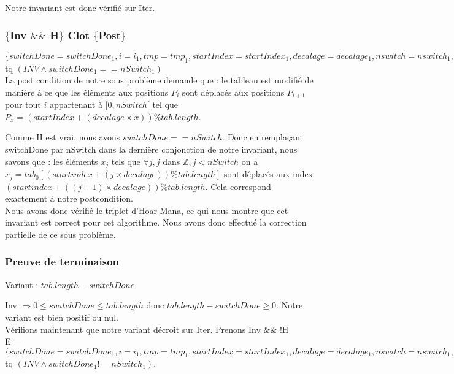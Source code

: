 Notre invariant est donc vérifié sur Iter. \\

\subsubsection*{$\{$Inv $\&\&$ H$\}$ Clot $\{$Post$\}$}

$\{switchDone = switchDone_{1}, i = i_{1}, tmp = tmp_{1}, startIndex = startIndex_{1}, decalage = decalage_{1}, nswitch = nswitch_{1}, tab = tab_{1}\}$\\ 
tq $(INV \wedge switchDone_{1} == nSwitch_{1})$ \\

La post condition de notre sous problème demande que : le tableau est modifié de manière à ce que les éléments aux positions $P_{i}$ sont déplacés aux positions $P_{i+1}$ pour tout $i$ appartenant à $[0,nSwitch[$ tel que $P_{x} = (startIndex + (decalage\times x)) \% tab.length$.

Comme H est vrai, nous avons $switchDone == nSwitch$. Donc en remplaçant switchDone par nSwitch dans la dernière conjonction de notre invariant, nous savons que : les éléments $x_{j}$ tels que $\forall j, j$ dans $\mathbb{Z}, j<nSwitch$ on a $x_{j}=tab_{0}[(startindex + (j\times decalage)) \% tab.length]$ sont déplacés aux index $(startindex + ((j+1)\times decalage)) \% tab.length.$ 
Cela correspond exactement à notre postcondition.\\

Nous avons donc vérifié le triplet d'Hoar-Mana, ce qui nous montre que cet invariant est correct pour cet algorithme. 
Nous avons donc effectué la correction partielle de ce sous problème. 


\subsubsection*{Preuve de terminaison}
Variant  : $tab.length - switchDone$

Inv $\Rightarrow 0 \leq switchDone \leq tab.length$ donc $tab.length - switchDone \geq 0$. Notre variant est bien positif ou nul.\\ 

Vérifions maintenant que notre variant décroit sur Iter. Prenons Inv $\&\&$ !H \\

E = $\{ switchDone = switchDone_{1}, i = i_{1}, tmp = tmp_{1}, startIndex = startIndex_{1}, decalage = decalage_{1}, nswitch = nswitch_{1}, tab = tab_{1}\}$\\
tq $(INV \wedge switchDone_{1} != nSwitch_{1})$.\\

